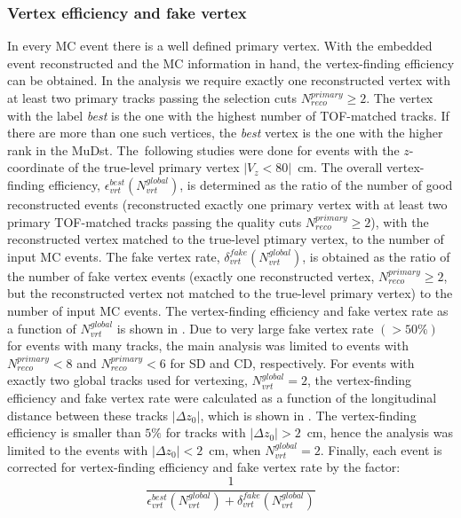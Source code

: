 \subsubsection{Vertex efficiency and fake vertex}
In every MC event there is a well defined primary vertex.  With the embedded
event reconstructed and the MC information in hand,
the vertex-finding efficiency can be obtained. In the analysis we require exactly one reconstructed vertex with at least two primary tracks passing the selection cuts $N_{reco}^{primary}\geq 2$. The vertex with the label \textit{best} is the one with the highest number of TOF-matched tracks. If there are more than one such vertices, the \textit{best} vertex is the one with the higher rank in the MuDst. The~following studies were done for events with the $z$-coordinate of the true-level primary vertex \mbox{$|V_z<80|$~cm}. The overall
vertex-finding efficiency, $\epsilon_{vrt}^ {best}\left(N_{vrt}^{global}\right)$, is determined as the
ratio of the number of good reconstructed events (reconstructed exactly one primary vertex with at least two primary TOF-matched tracks passing the quality cuts $N_{reco}^{primary}\geq 2$), with the reconstructed vertex matched to the true-level ptimary vertex, to the number of input MC events. The fake vertex
rate, $\delta_{vrt}^{fake}\left(N_{vrt}^{global}\right)$, is obtained as the ratio of the number 
of fake vertex events (exactly one reconstructed vertex, $N_{reco}^{primary}\geq 2$, but the reconstructed vertex not matched to the true-level primary vertex) to the number of input MC events. The vertex-finding efficiency and fake vertex rate as a function of $N^{global}_{vrt}$ is shown in  . Due to very large fake vertex rate $(>50\%)$ for events with many tracks, the main analysis was limited to events with $N_{reco}^{primary} < 8$ and $N_{reco}^{primary}<6$ for SD and CD, respectively. 
For events with exactly two global tracks used for vertexing, $N^{global}_{vrt}=2$, the vertex-finding efficiency and fake vertex rate were calculated as a function of the longitudinal distance between these tracks $|\Delta z_0|$, which is shown in . The vertex-finding efficiency is smaller than $5\%$ for tracks with $|\Delta z_0|>2$~cm, hence the analysis was limited to the events with  $|\Delta z_0|<2$~cm, when $N^{global}_{vrt}=2$. Finally, each event is corrected for vertex-finding efficiency and fake vertex rate by the factor:
\begin{equation}
\frac{1}{\epsilon_{vrt}^ {best}\left(N_{vrt}^{global}\right) + \delta_{vrt}^{fake}\left(N_{vrt}^{global}\right)}
\label{eq:vertexEffi}
\end{equation}

